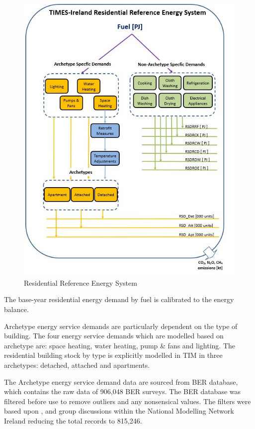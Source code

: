 \documentclass[gmd,manuscript]{copernicus}
\begin{document}
\begin{figure}[hb!]
 \centering
 \includegraphics[scale=3.2]{figures/TIM_Residential_RES.jpg} 
 \caption{Residential Reference Energy System}
 \label{fig:TIM_RES}
\end{figure}

The base-year residential energy demand by fuel is calibrated to the \citet{SEAI2019} energy balance.

Archetype energy service demands are particularly dependent on the type of building. The four energy service demands which are modelled based on archetype are: space heating, water heating, pump \& fans and lighting. The residential building stock by type is explicitly modelled in TIM in three archetypes: detached, attached and apartments. 

The Archetype energy service demand data are sourced from \citet{SustainableEnergyAuthorityofIreland} BER database, which contains the raw data of 906,048 BER surveys. The BER database was filtered before use to remove outliers and any nonsensical values. The filters were based upon \citet{Dineen2015}, \citet{Uidhir2020a} and group discussions within the National Modelling Network Ireland reducing the total records to 815,246.
\end{document}
